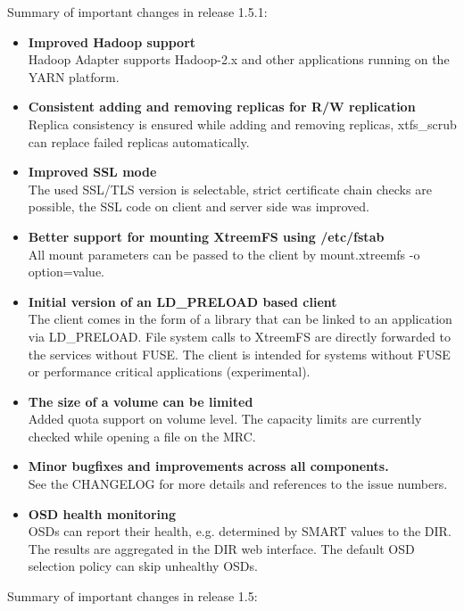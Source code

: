 \documentclass[a4paper,10pt]{book}
\begin{document}
Summary of important changes in release 1.5.1:

\begin{itemize}
  \item \textbf{Improved Hadoop support}\\
      Hadoop Adapter supports Hadoop-2.x and other applications running on the
      YARN platform.
  \item \textbf{Consistent adding and removing replicas for R/W replication}\\
      Replica consistency is ensured while adding and removing replicas,
      xtfs\_scrub can replace failed replicas automatically.
  \item \textbf{Improved SSL mode}\\
      The used SSL/TLS version is selectable, strict certificate chain checks
      are possible, the SSL code on client and server side was improved.
  \item \textbf{Better support for mounting XtreemFS using /etc/fstab}\\
      All mount parameters can be passed to the client by mount.xtreemfs -o
      option=value.
  \item \textbf{Initial version of an LD\_PRELOAD based client}\\
      The client comes in the form of a library that can be linked to an
      application via LD\_PRELOAD. File system calls to XtreemFS are directly
      forwarded to the services without FUSE. The client is intended for systems
      without FUSE or performance critical applications (experimental).
  \item \textbf{The size of a volume can be limited}\\
      Added quota support on volume level. The capacity limits are currently
      checked while opening a file on the MRC.
  \item \textbf{Minor bugfixes and improvements across all components.}\\
      See the CHANGELOG for more details and references to the issue numbers.
  \item \textbf{OSD health monitoring}\\
      OSDs can report their health, e.g. determined by SMART values to the DIR.
      The results are aggregated in the DIR web interface. The default OSD
      selection policy can skip unhealthy OSDs.
\end{itemize}

Summary of important changes in release 1.5:
\end{document}
